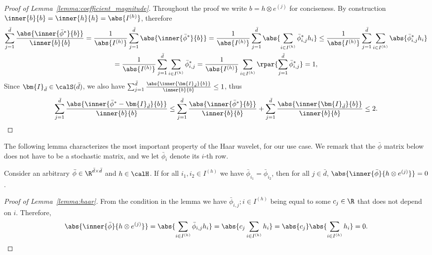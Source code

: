 \documentclass[10pt]{article}
\begin{document}
\begin{proof}[Proof of Lemma~\ref{lemma:coefficient_magnitude}]
Throughout the proof we write $b=h\otimes e^{(j)}$ for conciseness. By construction $\inner{b}{b}=\inner{h}{h}=\abs{I^{(h)}}$, therefore
\begin{multline*}
\sum_{j=1}^{\bar d}\frac{\abs{\inner{\bar\phi^*}{b}}}{\inner{b}{b}}=\frac{1}{\abs{I^{(h)}}}\sum_{j=1}^{\bar d}\abs{\inner{\bar\phi^*}{b}}=\frac{1}{\abs{I^{(h)}}}\sum_{j=1}^{\bar d}\abs{\sum_{i\in I^{(h)}}\bar\phi^*_{i,j}h_{i}}\leq \frac{1}{\abs{I^{(h)}}}\sum_{j=1}^{\bar d}\sum_{i\in I^{(h)}}\abs{\bar\phi^*_{i,j}h_{i}}\\=\frac{1}{\abs{I^{(h)}}}\sum_{j=1}^{\bar d}\sum_{i\in I^{(h)}}\bar\phi^*_{i,j}
=\frac{1}{\abs{I^{(h)}}}\sum_{i\in I^{(h)}}\rpar{\sum_{j=1}^{\bar d}\bar\phi^*_{i,j}}=1,
\end{multline*}
Since $\bm{I}_{\bar d}\in\calS(\bar d)$, we also have $\sum_{j=1}^{\bar d}\frac{\abs{\inner{\bm{I}_{\bar d}}{b}}}{\inner{b}{b}}\leq 1$, thus
\begin{equation*}
\sum_{j=1}^{\bar d}\frac{\abs{\inner{\bar\phi^*-\bm{I}_{\bar d}}{b}}}{\inner{b}{b}}\leq \sum_{j=1}^{\bar d}\frac{\abs{\inner{\bar\phi^*}{b}}}{\inner{b}{b}}+\sum_{j=1}^{\bar d}\frac{\abs{\inner{\bm{I}_{\bar d}}{b}}}{\inner{b}{b}}\leq 2.\qedhere
\end{equation*}
\end{proof}

The following lemma characterizes the most important property of the Haar wavelet, for our use case. We remark that the $\bar\phi$ matrix below does not have to be a stochastic matrix, and we let $\bar\phi_i$ denote its $i$-th row. 

\begin{lemma}\label{lemma:haar}
Consider an arbitrary $\bar\phi\in\R^{\bar d\times\bar d}$ and $h\in\calH$. If for all $i_1,i_2\in I^{(h)}$ we have $\bar\phi_{i_1}=\bar\phi_{i_2}$, then for all $j\in\bar d$, $\abs{\inner{\bar\phi}{h\otimes e^{(j)}}}=0$.
\end{lemma}

\begin{proof}[Proof of Lemma~\ref{lemma:haar}]
From the condition in the lemma we have $\bar\phi_{i,j};i\in I^{(h)}$ being equal to some $c_j\in\R$ that does not depend on $i$. Therefore,
\begin{equation*}
\abs{\inner{\bar\phi}{h\otimes e^{(j)}}}=\abs{\sum_{i\in I^{(h)}}\bar\phi_{i,j}h_{i}}=\abs{c_j\sum_{i\in I^{(h)}}h_{i}}=\abs{c_j}\abs{\sum_{i\in I^{(h)}}h_{i}}=0.\qedhere
\end{equation*}
\end{proof}
\end{document}
